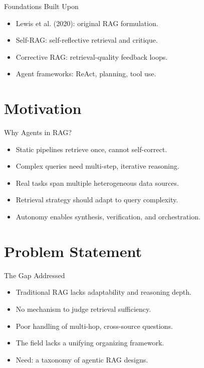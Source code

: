 \documentclass{beamer}
\begin{document}
\begin{frame}{Foundations Built Upon}
\begin{itemize}
\item Lewis et al. (2020): original RAG formulation.
\item Self-RAG: self-reflective retrieval and critique.
\item Corrective RAG: retrieval-quality feedback loops.
\item Agent frameworks: ReAct, planning, tool use.
\end{itemize}
\end{frame}

\section{Motivation}
\begin{frame}{Why Agents in RAG?}
\begin{itemize}
\item Static pipelines retrieve once, cannot self-correct.
\item Complex queries need multi-step, iterative reasoning.
\item Real tasks span multiple heterogeneous data sources.
\item Retrieval strategy should adapt to query complexity.
\item Autonomy enables synthesis, verification, and orchestration.
\end{itemize}
\end{frame}

\section{Problem Statement}
\begin{frame}{The Gap Addressed}
\begin{itemize}
\item Traditional RAG lacks adaptability and reasoning depth.
\item No mechanism to judge retrieval sufficiency.
\item Poor handling of multi-hop, cross-source questions.
\item The field lacks a unifying organizing framework.
\item Need: a taxonomy of agentic RAG designs.
\end{itemize}
\end{frame}
\end{document}
